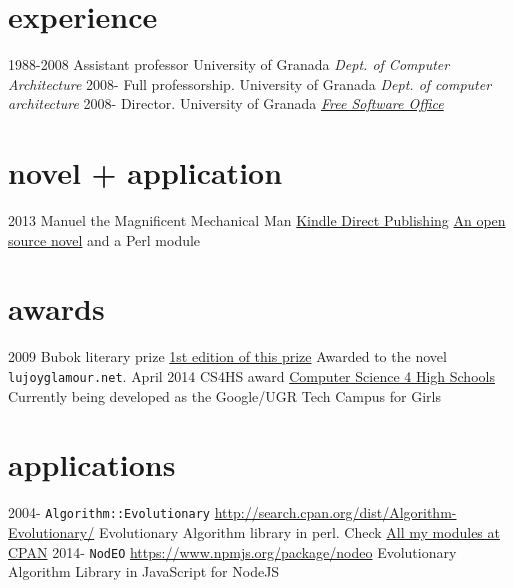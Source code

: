 \documentclass[]{friggeri-jj-cv}
\begin{document}
\section{experience}

\begin{entrylist}
  \entry
    {1988-2008}
    {Assistant professor}
    {University of Granada}
    {\emph{Dept. of Computer Architecture}}
  \entry
    {2008-}
    {Full professorship.}
    {University of Granada}
    {\emph{Dept. of computer architecture}}
    \entry
    {2008-}
    {Director.}
    {University of Granada}
    {\href{http://osl.ugr.es}{\emph{Free Software Office}}}
\end{entrylist}

\section{novel + application}
\begin{entrylist}
  \entry
    {2013}
    {Manuel the Magnificent Mechanical Man}
    {\href{http://www.amazon.com/dp/B00ED084BK/}{Kindle Direct Publishing}}
    {\href{http://jj.github.io/hoborg}{An open source novel} and a
      Perl module}
\end{entrylist}

\section{awards}
\begin{entrylist}
 \entry
    {2009}
    {Bubok literary prize}
    {\href{http://cultura.elpais.com/cultura/2009/05/06/actualidad/1241560804_850215.html}{1st
        edition of this prize}}
    {Awarded to the novel {\tt lujoyglamour.net}.}
 \entry
    {April 2014}
    {CS4HS award}
    {\href{http://cs4hs.com}{Computer Science 4 High Schools}}
    {Currently being developed as the Google/UGR Tech Campus for Girls}
\end{entrylist}


\section{applications}

\begin{entrylist}
  \entry
    {2004-}
    {{\tt Algorithm::Evolutionary}}
    {\href{http://search.cpan.org/dist/Algorithm-Evolutionary/}{http://search.cpan.org/dist/Algorithm-Evolutionary/}}
    {Evolutionary Algorithm library in
      perl. Check \href{http://search.cpan.org/~jmerelo/}{All my modules at CPAN}}
  \entry
    {2014-}
    {{\tt NodEO}}
    {\href{https://npmjs.org/package/nodeo}{https://www.npmjs.org/package/nodeo}}
    {Evolutionary Algorithm Library in JavaScript for NodeJS}
\end{entrylist}
\end{document}
